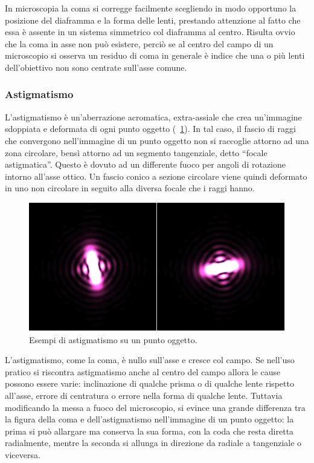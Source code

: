 In microscopia la coma si corregge facilmente scegliendo in modo opportuno la posizione del diaframma e la forma delle lenti, prestando attenzione al fatto che essa è assente in un sistema simmetrico col diaframma al centro.
Risulta ovvio che la coma in asse non può esistere, perciò se al centro del campo di un microscopio si osserva un residuo di coma in generale è indice che una o più lenti dell'obiettivo non sono centrate sull'asse comune.

\subsubsection*{Astigmatismo}
L'astigmatismo è un'aberrazione acromatica, extra-assiale che crea un'immagine sdoppiata e deformata di ogni punto oggetto (\figurename~\ref{fig:astigmatismo}). In tal caso, il fascio di raggi che convergono nell'immagine di un punto oggetto non si raccoglie attorno ad una zona circolare, bensì attorno ad un segmento tangenziale, detto ``focale astigmatica''.
Questo è dovuto ad un differente fuoco per angoli di rotazione intorno all'asse ottico.
Un fascio conico a sezione circolare viene quindi deformato in uno non circolare in seguito alla diversa focale che i raggi hanno.

\begin{figure}
 \centering
 \includegraphics[scale=.50]{img/CAP2astig.jpg}
 \caption{\small{Esempi di astigmatismo su un punto oggetto.}}
 \label{fig:astigmatismo}
\end{figure}

L'astigmatismo, come la coma, è nullo sull'asse e cresce col campo. 
Se nell'uso pratico si riscontra astigmatismo anche al centro del campo allora le cause possono essere varie: inclinazione di qualche prisma o di qualche lente rispetto all'asse, errore di centratura o errore nella forma di qualche lente.
Tuttavia modificando la messa a fuoco del microscopio, si evince una grande differenza tra la figura della coma e dell'astigmatismo nell'immagine di un punto oggetto: la prima si può allargare ma conserva la sua forma, con la coda che resta diretta radialmente, mentre la seconda si allunga in direzione da radiale a tangenziale o viceversa. 

